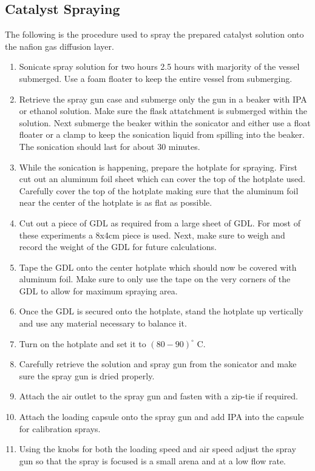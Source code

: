 \documentclass{article}
\begin{document}
		\subsection{Catalyst Spraying}
			The following is the procedure used to spray the prepared catalyst solution onto the nafion gas diffusion layer.
			\begin{enumerate}
				\item Sonicate spray solution for two hours 2.5 hours with marjority of the vessel submerged. Use a foam floater to keep the entire vessel from submerging.
        \item Retrieve the spray gun case and submerge only the gun in a beaker with IPA or ethanol solution. Make sure the flask attatchment is submerged within the solution. Next submerge the beaker within the sonicator and either use a float floater or a clamp to keep the sonication liquid from spilling into the beaker. The sonication should last for about 30 minutes.
        \item While the sonication is happening, prepare the hotplate for spraying. First cut out an aluminum foil sheet which can cover the top of the hotplate used. Carefully cover the top of the hotplate making sure that the aluminum foil near the center of the hotplate is as flat as possible.
        \item Cut out a piece of GDL as required from a large sheet of GDL. For most of these experiments a 8x4cm piece is used. Next, make sure to weigh and record the weight of the GDL for future calculations.
        \item Tape the GDL onto the center hotplate which should now be covered with aluminum foil. Make sure to only use the tape on the very corners of the GDL to allow for maximum spraying area.
        \item Once the GDL is secured onto the hotplate, stand the hotplate up vertically and use any material necessary to balance it.
        \item Turn on the hotplate and set it to $(80-90)^{\circ}$ C.
        \item Carefully retrieve the solution and spray gun from the sonicator and make sure the spray gun is dried properly.
        \item Attach the air outlet to the spray gun and fasten with a zip-tie if required.
        \item Attach the loading capsule onto the spray gun and add IPA into the capsule for calibration sprays.
        \item Using the knobs for both the loading speed and air speed adjust the spray gun so that the spray is focused is a small arena and at a low flow rate.

\end{enumerate}
\end{document}
